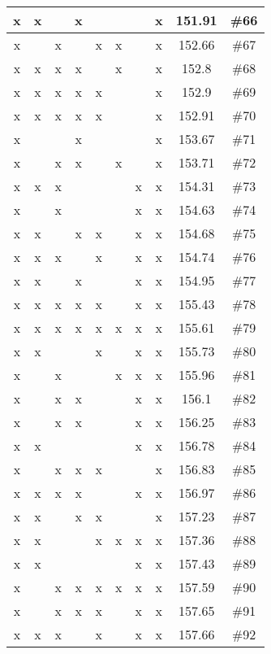 \begin{center}
\begin{longtable}{|c|c|c|c|c|c|c|c|c|c|}
 x &  x &  &  x &  &  &  &  x & 151.91 & \#66 \\ \hline
 x &  &  x &  &  x &  x &  &  x & 152.66 & \#67 \\ \hline
 x &  x &  x &  x &  &  x &  &  x & 152.8 & \#68 \\ \hline
 x &  x &  x &  x &  x &  &  &  x & 152.9 & \#69 \\ \hline
 x &  x &  x &  x &  x &  &  &  x & 152.91 & \#70 \\ \hline
 x &  &  &  x &  &  &  &  x & 153.67 & \#71 \\ \hline
 x &  &  x &  x &  &  x &  &  x & 153.71 & \#72 \\ \hline
 x &  x &  x &  &  &  &  x &  x & 154.31 & \#73 \\ \hline
 x &  &  x &  &  &  &  x &  x & 154.63 & \#74 \\ \hline
 x &  x &  &  x &  x &  &  x &  x & 154.68 & \#75 \\ \hline
 x &  x &  x &  &  x &  &  x &  x & 154.74 & \#76 \\ \hline
 x &  x &  &  x &  &  &  x &  x & 154.95 & \#77 \\ \hline
 x &  x &  x &  x &  x &  &  x &  x & 155.43 & \#78 \\ \hline
 x &  x &  x &  x &  x &  x &  x &  x & 155.61 & \#79 \\ \hline
 x &  x &  &  &  x &  &  x &  x & 155.73 & \#80 \\ \hline
 x &  &  x &  &  &  x &  x &  x & 155.96 & \#81 \\ \hline
 x &  &  x &  x &  &  &  x &  x & 156.1 & \#82 \\ \hline
 x &  &  x &  x &  &  &  x &  x & 156.25 & \#83 \\ \hline
 x &  x &  &  &  &  &  x &  x & 156.78 & \#84 \\ \hline
 x &  &  x &  x &  x &  &  &  x & 156.83 & \#85 \\ \hline
 x &  x &  x &  x &  &  &  x &  x & 156.97 & \#86 \\ \hline
 x &  x &  &  x &  x &  &  &  x & 157.23 & \#87 \\ \hline
 x &  x &  &  &  x &  x &  x &  x & 157.36 & \#88 \\ \hline
 x &  x &  &  &  &  &  x &  x & 157.43 & \#89 \\ \hline
 x &  &  x &  x &  x &  x &  x &  x & 157.59 & \#90 \\ \hline
 x &  &  x &  x &  x &  &  x &  x & 157.65 & \#91 \\ \hline
 x &  x &  x &  &  x &  &  x &  x & 157.66 & \#92 \\ \hline

\end{longtable}
\end{center}
